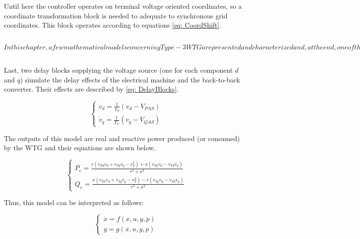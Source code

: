 Until here the controller operates on terminal voltage oriented coordinates, so a coordinate transformation block is needed to adequate to synchronous grid coordinates. This block operates according to equations \eqref{eq: CoordShift}.

\begin{equation}In this chapter, a few mathematical models concerning Type-3 WTG are presented and characterized and, at the end, one of them will be chosen as object of study.
	\begin{cases}
		V_{PAS} = -V_{PA}cos(\theta_{v}) - V_{QA}sin(\theta_{v}) \\
		V_{QAS} = V_{PA}sin(\theta_{v}) - V_{QA}cos(\theta_{v})
	\end{cases}
	\label{eq: CoordShift}
\end{equation}

Last, two delay blocks supplying the voltage source (one for each component $d$ and $q$) simulate the delay effects of the electrical machine and the back-to-back converter. Their effects are described by \eqref{eq: DelayBlocks}.

\begin{equation}
	\begin{cases}
		\dot{v}_{d} = \frac{1}{T_{V}}(v_{d} - V_{PAS}) \\
		\dot{v}_{q} = \frac{1}{T_{V}}(v_{q} - V_{QAS})
	\end{cases}
	\label{eq: DelayBlocks}
\end{equation}

The outputs of this model are real and reactive power produced (or consumed) by the WTG and their equations are shown below.

\begin{equation}
	\begin{cases}
		P_{e} = \frac{r(v_{Td}v_{d} + v_{Tq}v_{q} - v_{T}^{2}) + x(v_{Tq}v_{d} - v_{Td}v_{q})}{r^{2} + x^{2}} \\
		Q_{e} = \frac{x(v_{Td}v_{d} + v_{Tq}v_{q} - v_{T}^{2}) - r(v_{Tq}v_{d} - v_{Td}v_{q})}{r^{2} + x^{2}}
	\end{cases}
	\label{eq: Outputs}
\end{equation}

Thus, this model can be interpreted as follows:

\begin{equation}
	\begin{cases}
		\dot{x} = f(x, u, y, p) \\
		y = g(x, u, y, p)
	\end{cases}
	\label{eq: xdot}
\end{equation}

